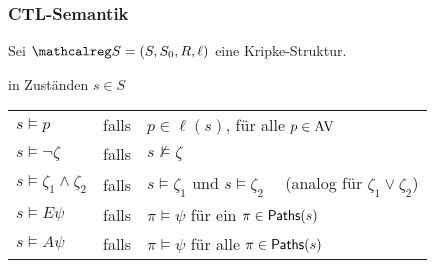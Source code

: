 \begin{frame}
  \frametitle{CTL-Semantik}

  Sei $\calS = (S,S_0,R,\ell)$ eine Kripke-Struktur.

  \begin{Definition}
     in Zuständen $s \in S$
    \par\medskip
    \begin{tabular}{@{\quad}lll@{}}
        $s \models p$                     & falls & $p \in \ell(s)$, für alle $p \in \textup{AV}$             \\[2pt]
        $s \models \lnot\zeta$            & falls & $s \not\models \zeta$                               \\[2pt]
        $s \models \zeta_1 \land \zeta_2$ & falls & $s \models \zeta_1$ und $s \models \zeta_2$
                                                    \quad~\, {\small (analog für $\zeta_1 \lor \zeta_2$)} \\[2pt]
        $s \models E\psi$                 & falls & $\pi \models \psi$ für ein $\pi \in \textsf{Paths}(s)$      \\[2pt]
        $s \models A\psi$                 & falls & $\pi \models \psi$ für alle $\pi \in \textsf{Paths}(s)$
    \end{tabular}

    \par\medskip
  \end{Definition}

  \par\smallskip

\end{frame}

